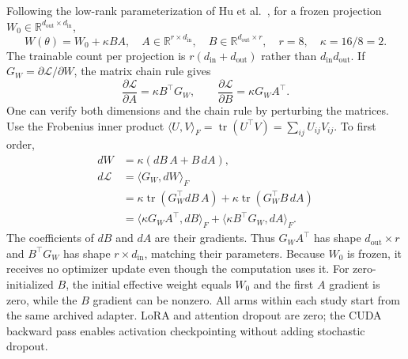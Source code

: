 \documentclass[11pt]{article}
\begin{document}
Following the low-rank parameterization of Hu et al.~\cite{lora}, for a frozen projection $W_0\in\mathbb R^{d_{\mathrm{out}}\times d_{\mathrm{in}}}$,
\begin{equation}
 W(\theta)=W_0+\kappa BA,\quad
 A\in\mathbb R^{r\times d_{\mathrm{in}}},\quad
 B\in\mathbb R^{d_{\mathrm{out}}\times r},\quad r=8,\quad\kappa=16/8=2.
\end{equation}
The trainable count per projection is $r(d_{\mathrm{in}}+d_{\mathrm{out}})$ rather than $d_{\mathrm{in}}d_{\mathrm{out}}$. If $G_W=\partial\mathcal L/\partial W$, the matrix chain rule gives
\begin{equation}
 \frac{\partial\mathcal L}{\partial A}=\kappa B^\top G_W,\qquad
 \frac{\partial\mathcal L}{\partial B}=\kappa G_W A^\top.
\end{equation}
One can verify both dimensions and the chain rule by perturbing the matrices. Use the Frobenius inner product $\langle U,V\rangle_F=\operatorname{tr}(U^\top V)=\sum_{ij}U_{ij}V_{ij}$. To first order,
\begin{align}
 dW&=\kappa(dB\,A+B\,dA),\\
 d\mathcal L&=\langle G_W,dW\rangle_F\\
 &=\kappa\operatorname{tr}(G_W^\top dB\,A)
       +\kappa\operatorname{tr}(G_W^\top B\,dA)\\
 &=\langle\kappa G_WA^\top,dB\rangle_F
       +\langle\kappa B^\top G_W,dA\rangle_F.
\end{align}
The coefficients of $dB$ and $dA$ are their gradients. Thus $G_WA^\top$ has shape $d_{\mathrm{out}}\times r$ and $B^\top G_W$ has shape $r\times d_{\mathrm{in}}$, matching their parameters. Because $W_0$ is frozen, it receives no optimizer update even though the computation uses it.
For zero-initialized $B$, the initial effective weight equals $W_0$ and the first $A$ gradient is zero, while the $B$ gradient can be nonzero. All arms within each study start from the same archived adapter. LoRA and attention dropout are zero; the CUDA backward pass enables activation checkpointing without adding stochastic dropout.
\end{document}
